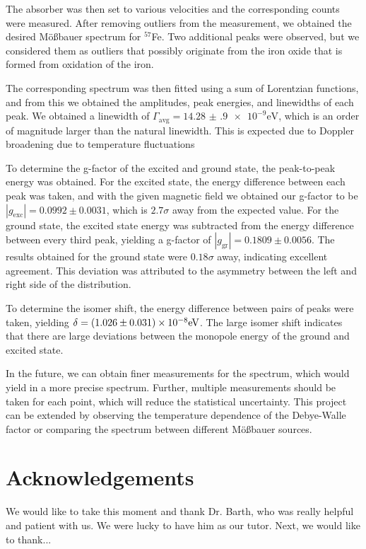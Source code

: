 \documentclass[a4paper]{report}
\numberwithin{equation}{section}
\begin{document}
 The absorber was then set to various velocities and the corresponding counts were measured. 
 After removing outliers from the measurement, we obtained the desired M\"o{\ss}bauer
 spectrum for $^{57}$Fe. Two additional peaks were observed, but we considered them as outliers 
 that possibly originate from the iron oxide that is formed from oxidation of the iron. \par
 
 The corresponding spectrum was then fitted using a sum of Lorentzian 
 functions, and from this we obtained the amplitudes, peak energies, and linewidths of 
 each peak. We obtained a linewidth of $\Gamma_{\mathrm{avg}} = \num[{scientific-notation = true}]{14.28(90)e-9}\si{\electronvolt}$,
 which is an order of magnitude larger than the natural linewidth. This is expected due to 
 Doppler broadening due to temperature fluctuations \par
 
To determine the g-factor of the excited and ground state, the peak-to-peak energy was obtained. 
For the excited state, the energy difference between each peak was taken, and with the given
magnetic field we obtained our g-factor to be $| g_\mathrm{exc} | = 0.0992 \pm 0.0031$, which is
$2.7\sigma$ away from the expected value. For the ground state, the excited state energy was 
subtracted from the energy difference between every third peak, yielding a g-factor of $| g_\mathrm{gr} | = 0.1809 \pm 0.0056$.
The results obtained for the ground state were $0.18\sigma$ away, indicating excellent agreement. This deviation
was attributed to the asymmetry between the left and right side of the distribution. \par 

To determine the isomer shift, the energy difference between pairs of peaks were taken, yielding 
$\delta = \num[scientific-notation=true]{0.1026(31)e-7}\si[]{\electronvolt}$. The large isomer shift
indicates that there are large deviations between the monopole energy of the ground and excited state. \par 

In the future, we can obtain finer measurements for the spectrum, which would yield 
in a more precise spectrum. Further, multiple measurements should be taken for each point, which 
will reduce the statistical uncertainty. This project can be extended by observing the temperature 
dependence of the Debye-Walle factor or comparing the spectrum between different M\"o{\ss}bauer sources.


\chapter{Acknowledgements}
We would like to take this moment and thank Dr. Barth, who was really helpful and patient with us. We were lucky to have him as our tutor. Next, we would like to thank...
\end{document}
